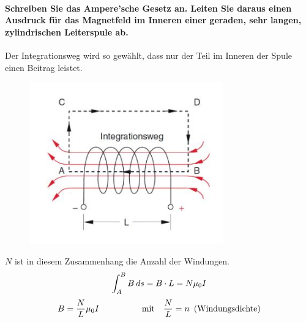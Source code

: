 \documentclass[a4paper, 11pt, ngerman, parskip=half-]{scrartcl}
\begin{document}
\paragraph{Schreiben Sie das Ampere'sche Gesetz an. Leiten Sie daraus einen Ausdruck für das
    Magnetfeld im Inneren einer geraden, sehr langen, zylindrischen Leiterspule ab.}
Der Integrationsweg wird so gewählt, dass nur der Teil im Inneren der Spule einen Beitrag leistet.
\begin{figure}[H]
    \centering
    \label{Integrationsweg}
    \includegraphics[height=7cm]{image/05/5.2.JPG}
\end{figure}
$N$ ist in diesem Zusammenhang die Anzahl der Windungen.
\begin{equation}
    \int_A^{B} B \hspace{0.2em} ds = B\cdot L = N\mu_0 I
\end{equation}
\begin{equation}
    B = \frac{N}{L}\mu_0 I \hspace{5em} \text{mit} \hspace{1em} \frac{N}{L} = n \hspace{0.5em} \text{(Windungsdichte)}
\end{equation}
\end{document}
